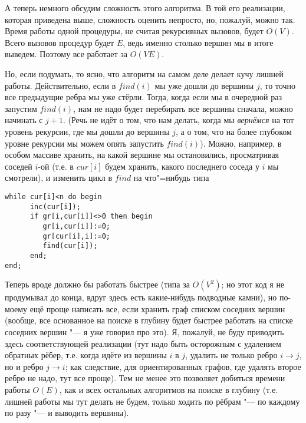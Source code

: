 А теперь немного обсудим сложность этого алгоритма. В той его реализации, которая приведена выше, 
сложность оценить непросто, но, пожалуй, можно так. Время работы одной процедуры, не считая 
рекурсивных вызовов, будет $O(V)$. Всего вызовов процедур будет $E$, ведь именно столько вершин мы 
в итоге выведем. Поэтому все работает за $O(VE)$.

Но, если подумать, то ясно, что алгоритм на самом деле делает кучу лишней работы. Действительно, 
если в $find(i)$ мы уже дошли до вершины $j$, то точно все предыдущие ребра мы уже стёрли. Тогда, 
когда если мы в очередной раз запустим $find(i)$, нам не надо будет перебирать все вершины сначала, 
можно начинать с $j+1$. (Речь не идёт о том, что нам делать, когда мы \textit{вернёмся} на тот 
уровень рекурсии, где мы дошли до вершины $j$, а о том, что на более глубоком уровне рекурсии мы 
можем опять запустить $find(i)$). Можно, например, в особом массиве хранить, на какой вершине мы 
остановились, просматривая соседей $i$-ой (т.е. в $cur[i]$ будем хранить, какого последнего соседа 
у $i$ мы смотрели), и изменить цикл в $find$ на что"=нибудь типа
\begin{codesampleo}\begin{verbatim}
while cur[i]<n do begin
      inc(cur[i]);
      if gr[i,cur[i]]<>0 then begin
         gr[i,cur[i]]:=0;
         gr[cur[i],i]:=0;
         find(cur[i]);
      end;
end;
\end{verbatim}
\end{codesampleo}

Теперь вроде должно бы работать быстрее (типа за $O(V^2)$; но этот код я не продумывал до конца,
вдруг здесь есть какие-нибудь подводные камни), но по-моему ещё проще написать все, если хранить 
граф списком соседних вершин (вообще, все основанное на поиске в глубину будет быстрее работать 
на списке соседних вершин "--- я уже говорил про это). Я, пожалуй, не буду приводить здесь 
соответствующей реализации (тут надо быть осторожным с удалением обратных рёбер, т.е. когда идёте 
из вершины $i$ в $j$, удалить не только ребро $i\to j$, но и ребро $j\to i$; как следствие, для 
ориентированных графов, где удалять второе ребро не надо, тут все проще). Тем не менее это 
позволяет добиться времени работы $O(E)$, как и всех остальных алгоритмов на поиске в глубину (т.е. 
лишней работы мы тут делать не будем, только ходить по рёбрам "--- по каждому по разу "--- и 
выводить вершины).